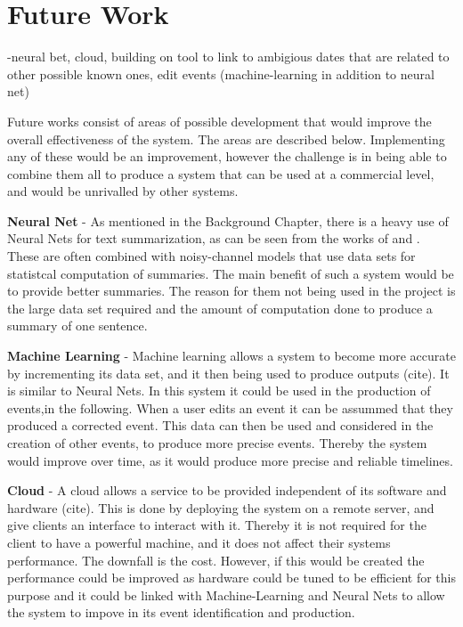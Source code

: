 \section{Future Work}
-neural bet, cloud, building on tool to link to ambigious dates that are related to other possible known ones, edit events (machine-learning in addition to neural net)
\par Future works consist of areas of possible development that would improve the overall effectiveness of the system. The areas are described below. Implementing any of these would be an improvement, however the challenge is in being able to combine them all to produce a system that can be used at a commercial level, and would be unrivalled by other systems.
\par \textbf{Neural Net} - As mentioned in the Background Chapter, there is a heavy use of Neural Nets for text summarization, as can be seen from the works of \cite{chopraaulirush2016} and \cite{rushchopraweston2015}. These are often combined with noisy-channel models that use data sets for statistcal computation of summaries. The main benefit of such a system would be to provide better summaries. The reason for them not being used in the project is the large data set required and the amount of computation done to produce a summary of one sentence.
\par \textbf{Machine Learning} - Machine learning allows a system to become more accurate by incrementing its data set, and it then being used to produce outputs (cite). It is similar to Neural Nets. In this system it could be used in the production of events,in the following. When a user edits an event it can be assummed that they produced a corrected event. This data can then be used and considered in the creation of other events, to produce more precise events. Thereby the system would improve over time, as it would produce more precise and reliable timelines.
\par \textbf{Cloud} - A cloud allows a service to be provided independent of its software and hardware (cite). This is done by deploying the system on a remote server, and give clients an interface to interact with it. Thereby it is not required for the client to have a powerful machine, and it does not affect their systems performance. The downfall is the cost. However, if this would be created the performance could be improved as hardware could be tuned to be efficient for this purpose and it could be linked with Machine-Learning and Neural Nets to allow the system to impove in its event identification and production.
